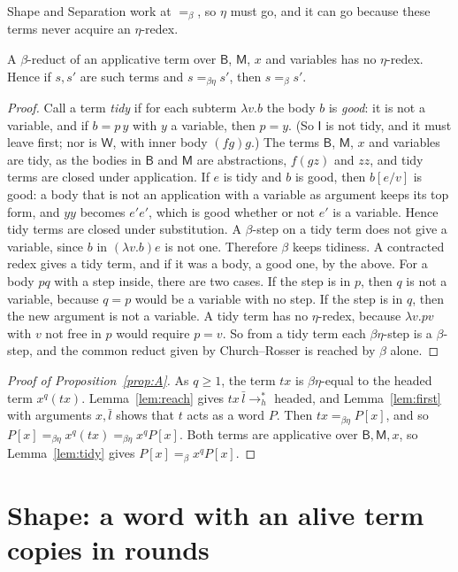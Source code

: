 \documentclass[a4paper,english]{lipics-v2021}
\newcommand{\B}{\mathsf{B}}
\newcommand{\M}{\mathsf{M}}
\newcommand{\I}{\mathsf{I}}
\newcommand{\W}{\mathsf{W}}
\newcommand{\hred}{\to_{h}}
\newcommand{\eqb}{=_{\beta}}
\newcommand{\eqbe}{=_{\beta\eta}}
\begin{document}
Shape and Separation work at $\eqb$, so $\eta$ must go, and it can go because these terms never acquire an $\eta$-redex.

\begin{lemma}[No $\eta$]\label{lem:tidy}
A $\beta$-reduct of an applicative term over $\B$, $\M$, $x$ and variables has no $\eta$-redex. Hence if $s,s'$ are such terms and $s \eqbe s'$, then $s \eqb s'$.
\end{lemma}

\begin{proof}
Call a term \emph{tidy} if for each subterm $\lambda v.b$ the body $b$ is \emph{good}: it is not a variable, and if $b = p\,y$ with $y$ a variable, then $p = y$. (So $\I$ is not tidy, and it must leave first; nor is $\W$, with inner body $(fg)g$.) The terms $\B$, $\M$, $x$ and variables are tidy, as the bodies in $\B$ and $\M$ are abstractions, $f(gz)$ and $zz$, and tidy terms are closed under application. If $e$ is tidy and $b$ is good, then $b[e/v]$ is good: a body that is not an application with a variable as argument keeps its top form, and $yy$ becomes $e'e'$, which is good whether or not $e'$ is a variable. Hence tidy terms are closed under substitution. A $\beta$-step on a tidy term does not give a variable, since $b$ in $(\lambda v.b)e$ is not one. Therefore $\beta$ keeps tidiness. A contracted redex gives a tidy term, and if it was a body, a good one, by the above. For a body $pq$ with a step inside, there are two cases. If the step is in $p$, then $q$ is not a variable, because $q = p$ would be a variable with no step. If the step is in $q$, then the new argument is not a variable. A tidy term has no $\eta$-redex, because $\lambda v.pv$ with $v$ not free in $p$ would require $p = v$. So from a tidy term each $\beta\eta$-step is a $\beta$-step, and the common reduct given by Church--Rosser is reached by $\beta$ alone.
\end{proof}

\begin{proof}[Proof of Proposition~\ref{prop:A}]
As $q \geq 1$, the term $tx$ is $\beta\eta$-equal to the headed term $x^q(tx)$. Lemma~\ref{lem:reach} gives $tx\,\bar l \hred^*$ headed, and Lemma~\ref{lem:first} with arguments $x,\bar l$ shows that $t$ acts as a word $P$. Then $tx \eqbe P[x]$, and so $P[x] \eqbe x^q(tx) \eqbe x^qP[x]$. Both terms are applicative over $\B,\M,x$, so Lemma~\ref{lem:tidy} gives $P[x] \eqb x^qP[x]$.
\end{proof}

\section{Shape: a word with an alive term copies in rounds}\label{sec:partB}
\end{document}
